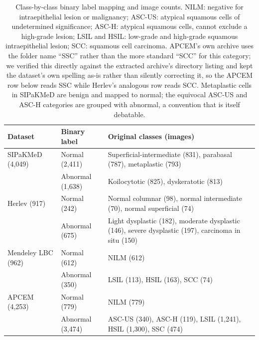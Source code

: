 \documentclass[12pt,letterpaper]{article}
\begin{document}
\begin{table}[htbp]
\centering
\caption{Class-by-class binary label mapping and image counts. NILM: negative for intraepithelial lesion or malignancy; ASC-US: atypical squamous cells of undetermined significance; ASC-H: atypical squamous cells, cannot exclude a high-grade lesion; LSIL and HSIL: low-grade and high-grade squamous intraepithelial lesion; SCC: squamous cell carcinoma. APCEM's own archive uses the folder name ``SSC'' rather than the more standard ``SCC'' for this category; we verified this directly against the extracted archive's directory listing and kept the dataset's own spelling as-is rather than silently correcting it, so the APCEM row below reads SSC while Herlev's analogous row reads SCC. Metaplastic cells in SIPaKMeD are benign and mapped to normal; the equivocal ASC-US and ASC-H categories are grouped with abnormal, a convention that is itself debatable.}
\label{tab:labels}
\footnotesize
\begin{tabular}{@{}p{2.5cm}p{1.9cm}p{9.2cm}@{}}
\toprule
Dataset & Binary label & Original classes (images) \\
\midrule
SIPaKMeD (4,049) & Normal (2,411) & Superficial-intermediate (831), parabasal (787), metaplastic (793) \\
 & Abnormal (1,638) & Koilocytotic (825), dyskeratotic (813) \\
\addlinespace
Herlev (917) & Normal (242) & Normal columnar (98), normal intermediate (70), normal superficial (74) \\
 & Abnormal (675) & Light dysplastic (182), moderate dysplastic (146), severe dysplastic (197), carcinoma in situ (150) \\
\addlinespace
Mendeley LBC (962) & Normal (612) & NILM (612) \\
 & Abnormal (350) & LSIL (113), HSIL (163), SCC (74) \\
\addlinespace
APCEM (4,253) & Normal (779) & NILM (779) \\
 & Abnormal (3,474) & ASC-US (340), ASC-H (119), LSIL (1,241), HSIL (1,300), SSC (474) \\
\bottomrule
\end{tabular}
\end{table}
\end{document}
